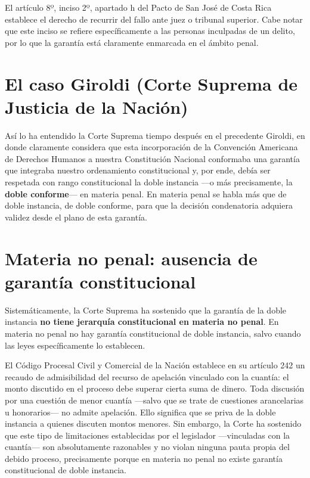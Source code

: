\documentclass[12pt,oneside]{book}
\begin{document}
El artículo 8º, inciso 2º, apartado h del Pacto de San José de Costa Rica establece el derecho de recurrir del fallo ante juez o tribunal superior. Cabe notar que este inciso se refiere específicamente a las personas inculpadas de un delito, por lo que la garantía está claramente enmarcada en el ámbito penal.

\section{El caso Giroldi (Corte Suprema de Justicia de la Nación)}

Así lo ha entendido la Corte Suprema tiempo después en el precedente Giroldi, en donde claramente considera que esta incorporación de la Convención Americana de Derechos Humanos a nuestra Constitución Nacional conformaba una garantía que integraba nuestro ordenamiento constitucional y, por ende, debía ser respetada con rango constitucional la doble instancia ---o más precisamente, la \textbf{doble conforme}--- en materia penal. En materia penal se habla más que de doble instancia, de doble conforme, para que la decisión condenatoria adquiera validez desde el plano de esta garantía.

\section{Materia no penal: ausencia de garantía constitucional}

Sistemáticamente, la Corte Suprema ha sostenido que la garantía de la doble instancia \textbf{no tiene jerarquía constitucional en materia no penal}. En materia no penal no hay garantía constitucional de doble instancia, salvo cuando las leyes específicamente lo establecen.

El Código Procesal Civil y Comercial de la Nación establece en su artículo 242 un recaudo de admisibilidad del recurso de apelación vinculado con la cuantía: el monto discutido en el proceso debe superar cierta suma de dinero. Toda discusión por una cuestión de menor cuantía ---salvo que se trate de cuestiones arancelarias u honorarios--- no admite apelación. Ello significa que se priva de la doble instancia a quienes discuten montos menores. Sin embargo, la Corte ha sostenido que este tipo de limitaciones establecidas por el legislador ---vinculadas con la cuantía--- son absolutamente razonables y no violan ninguna pauta propia del debido proceso, precisamente porque en materia no penal no existe garantía constitucional de doble instancia.
\end{document}
